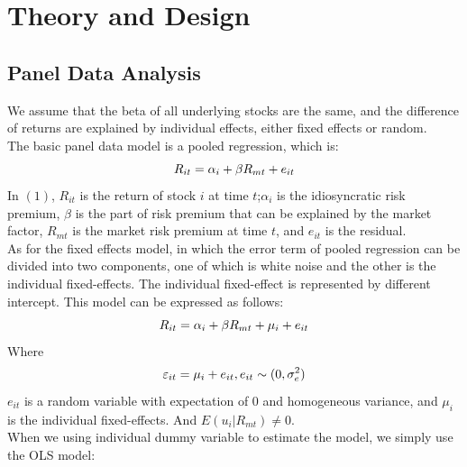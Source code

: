     \newpage
    \pagestyle{fancy}
    \section{Theory and Design}
    \subsection{Panel Data Analysis}
    \noindent We assume that the beta of all underlying stocks are the same, and the difference of returns are explained by individual effects, either fixed effects or random.\\
    [\baselineskip] \indent The basic panel data model \citep{baltagi2008econometric} is a pooled regression, which is:\\
    \begin{equation}\label{}
    R_{it}=\alpha_i+\beta R_{mt}+e_{it}\\
    \end{equation}
    In $(1)$, $R_{it}$ is the return of stock $i$ at time $t$;$\alpha_i$ is the idiosyncratic risk premium, $\beta$ is the part of risk premium that can be explained by the market factor, $R_{mt}$ is the market risk premium at time $t$, and $e_{it}$ is the residual.\\
    [\baselineskip] \indent As for the fixed effects model, in which the error term of pooled regression can be divided into two components, one of which is white noise and the other is the individual fixed-effects. The individual fixed-effect is represented by different intercept. This model can be expressed as follows:\\
    \begin{equation}\label{}
    R_{it}=\alpha_i+\beta R_{mt}+\mu_i+e_{it}\\
    \end{equation}
    Where
    \begin{equation}\label{}
    \varepsilon_{it}=\mu_i+e_{it},
    e_{it} \sim (0,\sigma^{2}_{e})\\
    \end{equation}
    $e_{it}$ is a random variable with expectation of 0 and homogeneous variance, and $\mu_{i}$ is the individual fixed-effects. And $E(u_i|R_{mt})\neq 0$.\\
    [\baselineskip] \indent When we using individual dummy variable to estimate the model, we simply use the OLS model:
